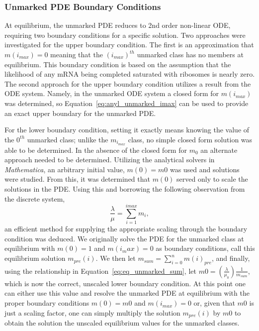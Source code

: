 \documentclass[review]{elsarticle}
\begin{document}
\subsubsection{Unmarked PDE Boundary Conditions}
At equilibrium, the unmarked PDE reduces to 2nd order non-linear ODE, requiring two boundary conditions for a specific solution.
Two approaches were investigated for the upper boundary condition.
The first is an approximation that $m(i_{max})=0$ meaning  that the $(i_{max})^{th}$ unmarked class has no members at equilibrium.
This boundary condition is based on the assumption that the likelihood of any mRNA being completed saturated with ribosomes is nearly zero.
The second approach for the upper boundary condition utilizes a result from the ODE system.
Namely, in the unmarked ODE system a closed form for $m(i_{max})$ was determined, so Equation~\ref{eq:anyl_unmarked_imax} can be used to provide an exact upper boundary for the unmarked PDE.

For the lower boundary condition, setting it exactly means knowing the value of the $0^{th}$ unmarked class; unlike the $m_{i_{max}}$ class, no simple closed form solution was able to be determined.
In the absence of the closed form for $m_0$ an alternate approach needed to be determined.
Utilizing the analytical solvers in \emph{Mathematica}, an arbitrary initial value, $m(0)=m0$ was used and solutions were studied.
From this, it was determined that $m(0)$ served only to scale the solutions in the PDE.
Using this and borrowing the following observation from the discrete system,
\begin{equation}\label{eq:eq_unmarked_sum}
\frac{\lambda}{\mu}=\sum_{i=1}^{imax}m_{i},
\end{equation}
an efficient method for supplying the appropriate scaling through the boundary condition was deduced.
We originally solve the PDE for the unmarked class at equilibrium with $m(0)=1$ and $m(i_max)=0$ as boundary conditions, call this equilibrium solution $m_{pre}(i)$.
We then let $m_{sum}=\sum_{i=0}^{n}m(i)_{pre}$, and finally, using the relationship in Equation~\ref{eq:eq_unmarked_sum}, let $m0=\left(\frac{\lambda}{\mu_0}\right)\frac{1}{m_{sum}}$, which is now the correct, unscaled lower boundary condition.
At this point one can either use this value and resolve the unmarked PDE at equilibrium with the proper boundary conditions $m(0)=m0$ and $m(i_{max})=0$ or, given that $m0$ is just a scaling factor, one can simply multiply the solution $m_{pre}(i)$ by $m0$ to obtain the solution the unscaled equilibrium values for the unmarked classes.
\end{document}
